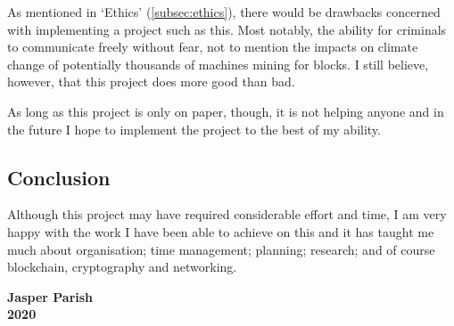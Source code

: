 \documentclass{article}
\begin{document}
As mentioned in `Ethics' (\autoref{subsec:ethics}), there would be drawbacks concerned with implementing a project such as this. Most notably, the ability for criminals to communicate freely without fear, not to mention the impacts on climate change of potentially thousands of machines mining for blocks. I still believe, however, that this project does more good than bad.

As long as this project is only on paper, though, it is not helping anyone and in the future I hope to implement the project to the best of my ability.

\subsection{Conclusion}
Although this project may have required considerable effort and time, I am very happy with the work I have been able to achieve on this and it has taught me much about organisation; time management; planning; research; and of course blockchain, cryptography and networking.

\clearpage
\printbibliography

\vspace{6.5cm}

\begin{center}
    \textbf{Jasper Parish\\2020}
\end{center}
\end{document}
